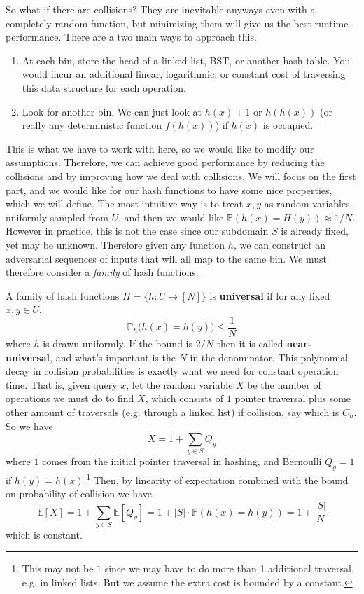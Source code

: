   So what if there are collisions? They are inevitable anyways even with a completely random function, but minimizing them will give us the best runtime performance. There are a two main ways to approach this. 
  \begin{enumerate}
    \item At each bin, store the head of a linked list, BST, or another hash table. You would incur an additional linear, logarithmic, or constant cost of traversing this data structure for each operation.  
    \item Look for another bin. We can just look at $h(x) + 1$ or $h(h(x))$ (or really any deterministic function $f(h(x))$) if $h(x)$ is occupied. 
  \end{enumerate}

  This is what we have to work with here, so we would like to modify our assumptions. Therefore, we can achieve good performance by reducing the collisions and by improving how we deal with collisions. We will focus on the first part, and we would like for our hash functions to have some nice properties, which we will define. The most intuitive way is to treat $x, y$ as random variables uniformly sampled from $U$, and then we would like $\mathbb{P}(h(x) = H(y)) \approx 1/N$. However in practice, this is not the case since our subdomain $S$ is already fixed, yet may be unknown. Therefore given any function $h$, we can construct an adversarial sequences of inputs that will all map to the same bin. We must therefore consider a \textit{family} of hash functions. 

  \begin{definition}
    A family of hash functions $H = \{h : U \rightarrow [N] \}$ is \textbf{universal} if for any fixed $x, y \in U$, 
    \begin{equation}
      \mathbb{P}_{h} \big( h(x) = h(y) \big) \leq \frac{1}{N}
    \end{equation}
    where $h$ is drawn uniformly. If the bound is $2/N$ then it is called \textbf{near-universal}, and what's important is the $N$ in the denominator. This polynomial decay in collision probabilities is exactly what we need for constant operation time. That is, given query $x$, let the random variable $X$ be the number of operations we must do to find $X$, which consists of $1$ pointer traversal plus some other amount of traversals (e.g. through a linked list) if collision, say which is $C_n$. So we have 
    \begin{equation}
      X = 1 + \sum_{y \in S} Q_y
    \end{equation}
    where $1$ comes from the initial pointer traversal in hashing, and Bernoulli $Q_y = 1$ if $h(y) = h(x)$.\footnote{This may not be $1$ since we may have to do more than 1 additional traversal, e.g. in linked lists. But we assume the extra cost is bounded by a constant.} Then, by linearity of expectation combined with the bound on probability of collision we have 
    \begin{equation}
      \mathbb{E}[X] = 1 + \sum_{y \in S} \mathbb{E}[Q_y] = 1 + |S| \cdot \mathbb{P}(h(x) = h(y)) = 1 + \frac{|S|}{N}
    \end{equation} 
    which is constant. 
  \end{definition} 

